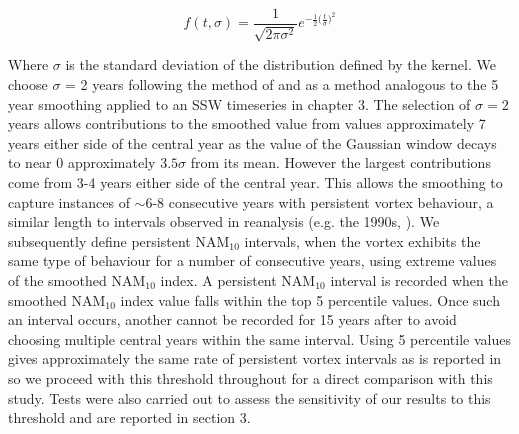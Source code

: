 \begin{equation} \label{Gaussian_filter}
f(t, \sigma) = \frac{1}{\sqrt{2 \pi \sigma^2}} e^{-\frac{1}{2}\big(\frac{t}{\sigma}\big)^2}
\end{equation}

Where $\sigma$ is the standard deviation of the distribution defined by the kernel. We choose $\sigma$ = 2 years following the method of \cite{reichlerStratospheric2012} and as a method analogous to the 5 year smoothing applied to an SSW timeseries in chapter 3. The selection of $\sigma = 2$ years allows contributions to the smoothed value from values approximately 7 years either side of the central year as the value of the Gaussian window decays to near 0 approximately $3.5\sigma$ from its mean. However the largest contributions come from 3-4 years either side of the central year. This allows the smoothing to capture instances of $\sim$6-8 consecutive years with persistent vortex behaviour, a similar length to intervals observed in reanalysis (e.g. the 1990s, \cite{pawsonCold1999}). We subsequently define persistent NAM$_{10}$ intervals, when the vortex exhibits the same type of behaviour for a number of consecutive years, using extreme values of the smoothed NAM$_{10}$ index. A persistent NAM$_{10}$ interval is recorded when the smoothed NAM$_{10}$ index value falls within the top 5 percentile values. Once such an interval occurs, another cannot be recorded for 15 years after to avoid choosing multiple central years within the same interval. Using 5 percentile values gives approximately the same rate of persistent vortex intervals as is reported in \cite{reichlerStratospheric2012} so we proceed with this threshold throughout for a direct comparison with this study. Tests were also carried out to assess the sensitivity of our results to this threshold and are reported in section 3.

